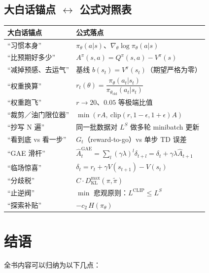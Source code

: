 \documentclass[UTF8,12pt,a4paper]{ctexrep}
\begin{document}
\section{大白话锚点 $\leftrightarrow$ 公式对照表}

\begin{center}
\small
{}
\begin{tabular}{p{5.2cm}p{7.2cm}}
\toprule
\textbf{大白话锚点} & \textbf{公式落点}\\
\midrule
``习惯本身'' & $\pi_\theta(a|s)$、$\nabla_\theta \log \pi_\theta(a|s)$\\
``比预期好多少'' & $A^{\pi}(s,a) = Q^{\pi}(s,a) - V^{\pi}(s)$\\
``减掉预感、去运气'' & 基线 $b(s_t) = V^{\pi}(s_t)$（期望严格为零）\\
``权重换算'' & $r_t(\theta) = \dfrac{\pi_\theta(a_t|s_t)}{\pi_{\theta_{\mathrm{old}}}(a_t|s_t)}$\\
``权重跑飞'' & $r \to 20$、$0.05$ 等极端比值\\
``裁剪／油门限位器'' & $\min\left(rA,\ \mathrm{clip}(r,1-\epsilon,1+\epsilon)A\right)$\\
``抄写 N 遍'' & 同一批数据对 $L^{S}$ 做多轮 minibatch 更新\\
``看到底 vs 看一步'' & $G_t$（reward-to-go）vs 单步 TD 误差\\
``GAE 滑杆'' & $\hat{A}^{\mathrm{GAE}}_t = \sum_l (\gamma\lambda)^l \delta_{t+l} = \delta_t + \gamma\lambda \hat{A}_{t+1}$\\
``临场惊喜'' & $\delta_t = r_t + \gamma V(s_{t+1}) - V(s_t)$\\
``分歧税'' & $C \cdot D_{\mathrm{KL}}^{\max}(\pi, \tilde\pi)$\\
``止逆阀'' & $\min$ 悲观原则：$L^{\mathrm{CLIP}} \le L^{S}$\\
``探索补贴'' & $-c_2\, H(\pi_\theta)$\\
\bottomrule
\end{tabular}
\end{center}

\chapter*{结语}

全书内容可以归纳为以下几点：
\end{document}
